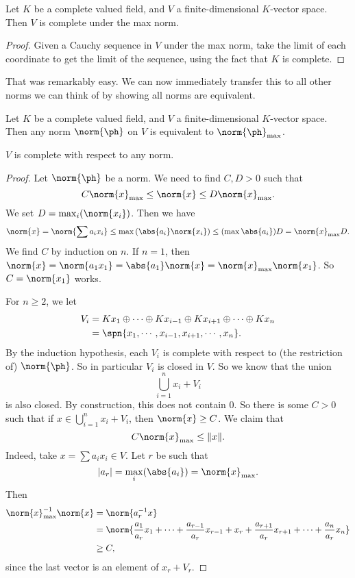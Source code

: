 \documentclass[a4paper]{article}
\begin{document}
\begin{prop}
  Let $K$ be a complete valued field, and $V$ a finite-dimensional $K$-vector space. Then $V$ is complete under the max norm.
\end{prop}

\begin{proof}
  Given a Cauchy sequence in $V$ under the max norm, take the limit of each coordinate to get the limit of the sequence, using the fact that $K$ is complete.
\end{proof}
That was remarkably easy. We can now immediately transfer this to all other norms we can think of by showing all norms are equivalent.

\begin{prop}
  Let $K$ be a complete valued field, and $V$ a finite-dimensional $K$-vector space. Then any norm $\norm{\ph}$ on $V$ is equivalent to $\norm{\ph}_{\mathrm{max}}$.
\end{prop}

\begin{cor}
  $V$ is complete with respect to any norm.
\end{cor}

\begin{proof}
  Let $\norm{\ph}$ be a norm. We need to find $C, D > 0$ such that
  \[
    C\norm{x}_{\mathrm{max}} \leq \norm{x} \leq D \norm{x}_{\mathrm{max}}.
  \]
  We set $D = \max_i(\norm{x_i})$. Then we have
  \[
    \norm{x} = \norm{\sum a_i x_i} \leq \max\left(\abs{a_i}\norm{x_i}\right) \leq (\max\abs{a_i}) D = \norm{x}_{\mathrm{max}}D.
  \]
  We find $C$ by induction on $n$. If $n = 1$, then $\norm{x} = \norm{a_1 x_1} = \abs{a_1} \norm{x} = \norm{x}_{\mathrm{max}}\norm{x_1}$. So $C = \norm{x_1}$ works.

  For $n \geq 2$, we let
  \begin{align*}
    V_i &= Kx_1 \oplus \cdots \oplus Kx_{i - 1} \oplus Kx_{i + 1} \oplus\cdots\oplus K x_n \\
    &= \spn\{x_1, \cdots, x_{i - 1}, x_{i + 1}, \cdots, x_n\}.
  \end{align*}
  By the induction hypothesis, each $V_i$ is complete with respect to (the restriction of) $\norm{\ph}$. So in particular $V_i$ is closed in $V$. So we know that the union
  \[
    \bigcup_{i = 1}^n x_i + V_i
  \]
  is also closed. By construction, this does not contain $0$. So there is some $C > 0$ such that if $x \in \bigcup_{i = 1}^n x_i + V_i$, then $\norm{x} \geq C$. We claim that
  \[
    C\norm{x}_{\mathrm{max}} \leq \|x\|.
  \]
  Indeed, take $x = \sum a_i x_i \in V$. Let $r$ be such that
  \[
    |a_r| = \max_i (\abs{a_i}) = \norm{x}_{\mathrm{max}}.
  \]
  Then
  \begin{align*}
    \norm{x}_{\mathrm{max}}^{-1}\norm{x} &= \norm{a_r^{-1}x} \\
    &= \norm{\frac{a_1}{a_r}x_1 + \cdots + \frac{a_{r - 1}}{a_r} x_{r - 1} + x_r + \frac{a_{r + 1}}{a_r} x_{r + 1} + \cdots + \frac{a_n}{a_r}x_n}\\
    &\geq C,
  \end{align*}
  since the last vector is an element of $x_r + V_r$.
\end{proof}
\end{document}
